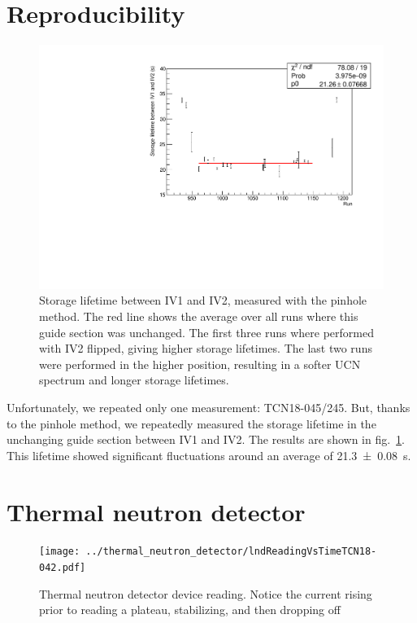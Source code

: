 \documentclass[10pt,letterpaper]{article}
\begin{document}
\section{Reproducibility}

\begin{figure}
\centering
\includegraphics[width=\textwidth]{../storagelifetime_with_monitor/pinhole.pdf}
\caption{Storage lifetime between IV1 and IV2, measured with the pinhole method. The red line shows the average over all runs where this guide section was unchanged. The first three runs where performed with IV2 flipped, giving higher storage lifetimes. The last two runs were performed in the higher position, resulting in a softer UCN spectrum and longer storage lifetimes.}
\label{fig:pinhole}
\end{figure}

Unfortunately, we repeated only one measurement: TCN18-045/245. But, thanks to the pinhole method, we repeatedly measured the storage lifetime in the unchanging guide section between IV1 and IV2. The results are shown in fig.~\ref{fig:pinhole}. This lifetime showed significant fluctuations around an average of \SI{21.3 +- 0.08}{\second}.



\section{Thermal neutron detector}

\begin{figure}
\centering
\texttt{[image: ../thermal\_neutron\_detector/lndReadingVsTimeTCN18-042.pdf]}
\caption{Thermal neutron detector device reading. Notice the current rising prior to reading a plateau, stabilizing, and then dropping off}
\label{fig:LNDplateau}
\end{figure}
\end{document}
